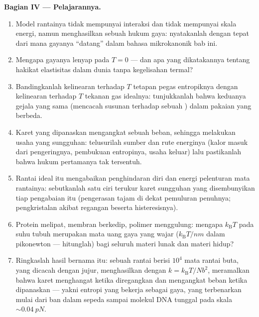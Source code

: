 \begin{problem}
\medskip\noindent\textbf{Bagian IV --- Pelajarannya.}
\begin{enumerate}[resume]
  \item Model rantainya tidak mempunyai interaksi dan tidak mempunyai
        skala energi, namun menghasilkan sebuah hukum gaya: nyatakanlah
        dengan tepat dari mana gayanya ``datang'' dalam bahasa
        mikrokanonik bab ini.
  \item Mengapa gayanya lenyap pada $T = 0$ --- dan apa yang dikatakannya
        tentang hakikat elastisitas dalam dunia tanpa kegelisahan termal?
  \item Bandingkanlah kelinearan terhadap $T$ tetapan pegas entropiknya
        dengan kelinearan terhadap $T$ tekanan gas idealnya: tunjukkanlah
        bahwa keduanya gejala yang sama (mencacah susunan terhadap sebuah
        ) dalam pakaian yang berbeda.
  \item Karet yang dipanaskan mengangkat sebuah beban, sehingga melakukan
        usaha yang sungguhan: telusurilah sumber dan rute energinya
        (kalor masuk dari pengeringnya, pembukuan entropinya, usaha
        keluar) lalu pastikanlah bahwa hukum pertamanya tak tersentuh.
  \item Rantai ideal itu mengabaikan penghindaran diri dan energi
        pelenturan mata rantainya: sebutkanlah satu ciri terukur karet
        sungguhan yang disembunyikan tiap pengabaian itu (pengerasan tajam
        di dekat pemuluran penuhnya; pengkristalan akibat regangan beserta
        histeresisnya).
  \item Protein melipat, membran berkedip, polimer menggulung: mengapa
        $k_{\text{B}}T$ pada suhu tubuh merupakan mata uang gaya yang
        wajar ($k_{\text{B}}T/\unit{nm}$ dalam pikonewton --- hitunglah)
        bagi seluruh materi lunak dan materi hidup?
  \item Ringkaslah hasil bernama itu: sebuah rantai berisi $10^4$ mata
        rantai buta, yang dicacah dengan jujur, menghasilkan  dengan $k =
        k_{\text{B}}T/Nb^2$, meramalkan bahwa karet menghangat
        ketika diregangkan dan mengangkat beban ketika dipanaskan ---
        yakni entropi yang bekerja sebagai gaya, yang terbenarkan mulai
        dari ban dalam sepeda sampai molekul DNA tunggal pada skala
        $\sim\qty{0.04}{pN}$.
\end{enumerate}
\end{problem}

